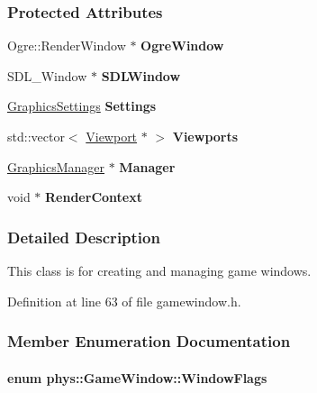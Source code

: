 \subsubsection*{Protected Attributes}
\begin{DoxyCompactItemize}
\item 
\hypertarget{classphys_1_1GameWindow_a0d8246623e8eec745b03f029215b2a6b}{
Ogre::RenderWindow $\ast$ {\bfseries OgreWindow}}
\label{dc/d4f/classphys_1_1GameWindow_a0d8246623e8eec745b03f029215b2a6b}

\item 
\hypertarget{classphys_1_1GameWindow_aa1d07338b6b6fd40b2fc7b6c813d721e}{
SDL\_\-Window $\ast$ {\bfseries SDLWindow}}
\label{dc/d4f/classphys_1_1GameWindow_aa1d07338b6b6fd40b2fc7b6c813d721e}

\item 
\hypertarget{classphys_1_1GameWindow_a1dba5999dd50a73b46b7aa0f53e7e529}{
\hyperlink{structphys_1_1GraphicsSettings}{GraphicsSettings} {\bfseries Settings}}
\label{dc/d4f/classphys_1_1GameWindow_a1dba5999dd50a73b46b7aa0f53e7e529}

\item 
\hypertarget{classphys_1_1GameWindow_a64b3471c627e82f4f66eb25d1db2893a}{
std::vector$<$ \hyperlink{classphys_1_1Viewport}{Viewport} $\ast$ $>$ {\bfseries Viewports}}
\label{dc/d4f/classphys_1_1GameWindow_a64b3471c627e82f4f66eb25d1db2893a}

\item 
\hypertarget{classphys_1_1GameWindow_aace5dc5e9cf498b22b9a905af66a7a4f}{
\hyperlink{classphys_1_1GraphicsManager}{GraphicsManager} $\ast$ {\bfseries Manager}}
\label{dc/d4f/classphys_1_1GameWindow_aace5dc5e9cf498b22b9a905af66a7a4f}

\item 
\hypertarget{classphys_1_1GameWindow_a0a16b6a49ffaac90ad9368793ea2d26f}{
void $\ast$ {\bfseries RenderContext}}
\label{dc/d4f/classphys_1_1GameWindow_a0a16b6a49ffaac90ad9368793ea2d26f}

\end{DoxyCompactItemize}


\subsubsection{Detailed Description}
This class is for creating and managing game windows. 

Definition at line 63 of file gamewindow.h.



\subsubsection{Member Enumeration Documentation}
\hypertarget{classphys_1_1GameWindow_ae4c6f1cc436ac9f20e43bd21a99885f5}{
\paragraph[{WindowFlags}]{\setlength{\rightskip}{0pt plus 5cm}enum {\bf phys::GameWindow::WindowFlags}}\hfill}
\label{dc/d4f/classphys_1_1GameWindow_ae4c6f1cc436ac9f20e43bd21a99885f5}


